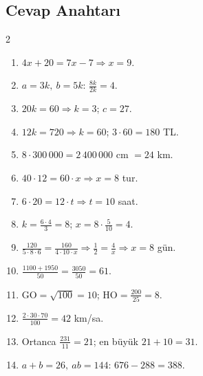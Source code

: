\subsection*{Cevap Anahtarı}
{\small
\begin{multicols}{2}
\begin{enumerate}[label=\textbf{\arabic*.},leftmargin=*,itemsep=1pt]
\item \(4x+20=7x-7\Rightarrow x=9\).
\item \(a=3k,\ b=5k\): \(\frac{8k}{2k}=4\).
\item \(20k=60\Rightarrow k=3\); \(c=27\).
\item \(12k=720\Rightarrow k=60\); \(3\cdot 60=180\) TL.
\item \(8\cdot 300\,000=2\,400\,000\) cm \(=24\) km.
\item \(40\cdot 12=60\cdot x\Rightarrow x=8\) tur.
\item \(6\cdot 20=12\cdot t\Rightarrow t=10\) saat.
\item \(k=\frac{6\cdot 4}{3}=8\); \(x=8\cdot\frac{5}{10}=4\).
\item \(\frac{120}{5\cdot 8\cdot 6}=\frac{160}{4\cdot 10\cdot x}\Rightarrow\frac12=\frac{4}{x}\Rightarrow x=8\) gün.
\item \(\frac{1100+1950}{50}=\frac{3050}{50}=61\).
\item \(\text{GO}=\sqrt{100}=10\); \(\text{HO}=\frac{200}{25}=8\).
\item \(\frac{2\cdot 30\cdot 70}{100}=42\) km/sa.
\item Ortanca \(\frac{231}{11}=21\); en büyük \(21+10=31\).
\item \(a+b=26,\ ab=144\): \(676-288=388\).
\end{enumerate}
\end{multicols}}
